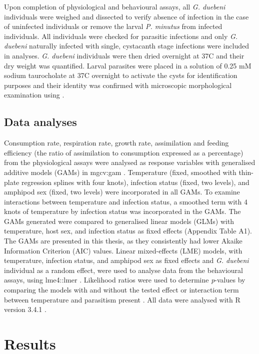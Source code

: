 Upon completion of physiological and behavioural assays, all \emph{G. duebeni} individuals were weighed and dissected to verify absence of infection in the case of uninfected individuals or remove the larval \emph{P. minutus} from infected individuals. All individuals were checked for parasitic infections and only \emph{G. duebeni} naturally infected with single, cystacanth stage infections were included in analyses. \emph{G. duebeni} individuals were then dried overnight at 37\degree C and their dry weight was quantified. Larval parasites were placed in a solution of 0.25 mM sodium taurocholate at 37\degree C overnight to activate the cysts for identification purposes \citep{horvath1969} and their identity was confirmed with microscopic morphological examination using \citet{mcdonald1988}. 

\subsection{Data analyses}

Consumption rate, respiration rate, growth rate, assimilation and feeding efficiency (the ratio of assimilation to consumption expressed as a percentage) from the physiological assays were analysed as response variables with generalised additive models (GAMs) in mgcv:gam \citep{wood2016}.  Temperature (fixed, smoothed with thin-plate regression splines with four knots), infection status (fixed, two levels), and amphipod sex (fixed, two levels) were incorporated in all GAMs. To examine interactions between temperature and infection status, a smoothed term with 4 knots of temperature by infection status was incorporated in the GAMs. The GAMs generated were compared to generalised linear models (GLMs) with temperature, host sex, and infection status as fixed effects (Appendix Table A1). The GAMs are presented in this thesis, as they consistently had lower Akaike Information Criterion (AIC) values. 
Linear mixed-effects (LME) models, with temperature, infection status, and amphipod sex as fixed effects and \emph{G. duebeni} individual as a random effect, were used to analyse data from the behavioural assays, using lme4::lmer \citep{bates2015}. Likelihood ratios were used to determine \emph{p}-values by comparing the models with and without the tested effect or interaction term between temperature and parasitism present \citep{crawley2012}. All data were analysed with R version 3.4.1 \citep{r2017}.

\section{Results}

